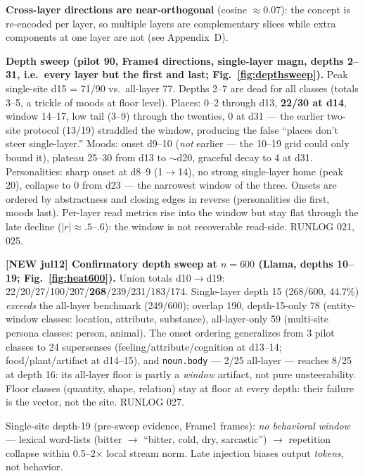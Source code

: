 \begin{outline}
\item [+] \textbf{Cross-layer directions are near-orthogonal} (cosine $\approx$0.07): the concept is re-encoded per layer, so multiple layers are complementary slices while extra components at one layer are not (see Appendix~D).
\item [+] \textbf{Depth sweep (pilot 90, Frame4 directions, single-layer magn, depths 2--31, i.e.\ every layer but the first and last; Fig.~\ref{fig:depthsweep}).} Peak single-site d15 = 71/90 vs.\ all-layer 77. Depths 2--7 are dead for all classes (totals 3--5, a trickle of moods at floor level). Places: 0--2 through d13, \textbf{22/30 at d14}, window 14--17, low tail (3--9) through the twenties, 0 at d31 --- the earlier two-site protocol (13/19) straddled the window, producing the false ``places don't steer single-layer.'' Moods: onset d9--10 (\emph{not} earlier --- the 10--19 grid could only bound it), plateau 25--30 from d13 to $\sim$d20, graceful decay to 4 at d31. Personalities: sharp onset at d8--9 (1$\to$14), no strong single-layer home (peak 20), collapse to 0 from d23 --- the narrowest window of the three. Onsets are ordered by abstractness and closing edges in reverse (personalities die first, moods last). Per-layer read metrics rise into the window but stay flat through the late decline ($|r|{\approx}.5$--$.6$): the window is not recoverable read-side. RUNLOG 021, 025.
\item [+] \textbf{[NEW jul12] Confirmatory depth sweep at $n{=}600$ (Llama, depths 10--19; Fig.~\ref{fig:heat600}).} Union totals d10$\to$d19: 22/20/27/100/207/\textbf{268}/239/231/183/174. Single-layer depth 15 (268/600, 44.7\%) \emph{exceeds} the all-layer benchmark (249/600); overlap 190, depth-15-only 78 (entity-window classes: location, attribute, substance), all-layer-only 59 (multi-site persona classes: person, animal). The onset ordering generalizes from 3 pilot classes to 24 supersenses (feeling/attribute/cognition at d13--14; food/plant/artifact at d14--15), and \texttt{noun.body} --- 2/25 all-layer --- reaches 8/25 at depth 16: its all-layer floor is partly a \emph{window} artifact, not pure unsteerability. Floor classes (quantity, shape, relation) stay at floor at every depth: their failure is the vector, not the site. RUNLOG 027.
\item [--] Single-site depth-19 (pre-sweep evidence, Frame1 frames): \emph{no behavioral window} --- lexical word-lists (bitter $\to$ ``bitter, cold, dry, sarcastic'') $\to$ repetition collapse within 0.5--2$\times$ local stream norm. Late injection biases output \emph{tokens}, not behavior.

\end{outline}
